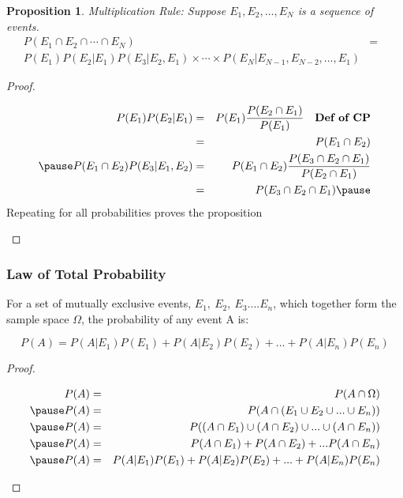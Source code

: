 \documentclass[aspectratio=169]{beamer}
\newtheorem{prop}{Proposition}
\numberwithin{equation}{section}
\begin{document}
\begin{frame}
\begin{prop} 
Multiplication Rule: 
Suppose $E_{1}, E_{2}, \hdots, E_{N}$ is a sequence of events.  
\begin{eqnarray}
P(E_{1}\cap E_{2}\cap \cdots \cap E_{N} ) & =& \nonumber \\
P(E_{1})P(E_{2}|E_{1}) P(E_{3}|E_2, E_{1} ) \times \cdots \times P(E_{N} | E_{N-1}, E_{N-2} , \hdots, E_{1} )  && \nonumber
\end{eqnarray}
\end{prop} 

\pause 
\begin{proof} 
\begin{small}
\begin{eqnarray}
P(E_{1}) P(E_{2}| E_{1} ) & = & P(E_{1}) \frac{P(E_{2} \cap E_{1} )}{P(E_{1})} \quad \textbf{Def of CP} \nonumber \\
& = & P(E_{1} \cap E_{2} ) \nonumber \\ \pause 
P(E_{1} \cap E_{2} ) P(E_{3}| E_{1}, E_{2} ) &= & P(E_{1} \cap E_{2} ) \frac{P(E_{3} \cap E_{2} \cap E_{1} )  }{P(E_{2} \cap E_{1} ) } \nonumber \\
& = & P(E_{3} \cap E_{2} \cap E_{1} )  \nonumber  \pause 
\end{eqnarray}
Repeating for all probabilities proves the proposition

\end{small}

\end{proof}


\end{frame}


\begin{frame}
\frametitle{Law of Total Probability}

For a set of mutually exclusive events, $E_1,\  E_2,\ E_3 .... E_n$, which together form the sample space $\Omega$, the probability of any event A is:

$$P(A)= P(A|E_1)P(E_1)+P(A|E_2)P(E_2)+...+P(A|E_n)P(E_n)$$
\pause
\begin{proof} 
\begin{small}
\begin{eqnarray}
P(A)& = &P(A\cap \Omega)  \nonumber  \\\pause
P(A)& = &P(A\cap (E_1\cup E_2 \cup ... \cup E_n))  \nonumber \\\pause
P(A)& = &P((A\cap E_1)\cup (A\cap E_2) \cup ... \cup(A\cap E_n)) \nonumber\\ \pause
P(A)& = & P(A\cap E_1)+ P(A\cap E_2) + ...P(A\cap E_n) \nonumber \\\pause
P(A)& = & P(A|E_1)P(E_1)+P(A|E_2)P(E_2)+...+P(A|E_n)P(E_n) \nonumber 
\end{eqnarray}
\end{small}

\end{proof}


\end{frame}
\end{document}
